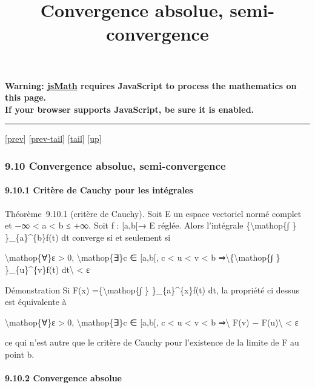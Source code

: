 \documentclass[]{article}
\title{Convergence absolue, semi-convergence}
\author{}
\date{}
\begin{document}
\maketitle

\textbf{Warning: \href{http://www.math.union.edu/locate/jsMath}{jsMath}
requires JavaScript to process the mathematics on this page.\\ If your
browser supports JavaScript, be sure it is enabled.}

\begin{center}\rule{3in}{0.4pt}\end{center}

{[}\href{coursse58.html}{prev}{]}
{[}\href{coursse58.html\#tailcoursse58.html}{prev-tail}{]}
{[}\hyperref[tailcoursse59.html]{tail}{]}
{[}\href{coursch10.html\#coursse59.html}{up}{]}

\subsubsection{9.10 Convergence absolue, semi-convergence}

\paragraph{9.10.1 Critère de Cauchy pour les intégrales}

Théorème~9.10.1 (critère de Cauchy). Soit E un espace vectoriel normé
complet et −∞ \textless{} a \textless{} b ≤ +∞. Soit f : {[}a,b{[}→ E
réglée. Alors l'intégrale \{\textbackslash{}mathop\{∫ \}
\}\_\{a\}\^{}\{b\}f(t) dt converge si et seulement si~

\textbackslash{}mathop\{∀\}ε \textgreater{} 0,
\textbackslash{}mathop\{∃\}c ∈ {[}a,b{[}, c \textless{} u \textless{} v
\textless{} b ⇒\textbackslash{}\textbar{}\{\textbackslash{}mathop\{∫ \}
\}\_\{u\}\^{}\{v\}f(t) dt\textbackslash{}\textbar{} \textless{} ε

Démonstration Si F(x) =\{\textbackslash{}mathop\{∫ \}
\}\_\{a\}\^{}\{x\}f(t) dt, la propriété ci dessus est équivalente à

\textbackslash{}mathop\{∀\}ε \textgreater{} 0,
\textbackslash{}mathop\{∃\}c ∈ {[}a,b{[}, c \textless{} u \textless{} v
\textless{} b ⇒\textbackslash{}\textbar{} F(v) −
F(u)\textbackslash{}\textbar{} \textless{} ε

ce qui n'est autre que le critère de Cauchy pour l'existence de la
limite de F au point b.

\paragraph{9.10.2 Convergence absolue}
\end{document}
